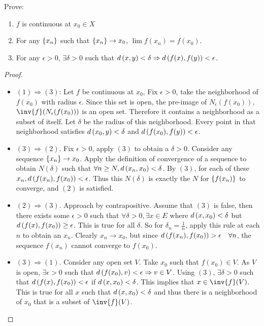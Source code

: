 \documentclass[12pt, letterpaper]{paper}
\begin{document}
\begin{question}
  Prove:
  \begin{enumerate}
  \item $f$ is continuous at $x_0 \in X$
  \item For any ${\left \{ x_n \right \}}$ such that ${\left \{ x_n \right \}} \to x_0$, $\lim f(x_n)
    = f(x_0)$.
  \item For any $\epsilon > 0$, $\exists \delta > 0$ such that $d \left ( x,y \right ) < \delta \Rightarrow
    d \left ( f(x), f(y) \right ) < \epsilon$.
  \end{enumerate}
  \begin{proof}
    \begin{itemize}
    \item $(1) \Rightarrow (3)$: Let $f$ be continuous at $x_0$, Fix
      $\epsilon > 0$, take the neighborhood of $f(x_0)$ with radius
      $\epsilon$. Since this set is open, the pre-image of $N_{\epsilon}(f(x_0))$,
      $\inv{f}( N_{\epsilon}(f({x_0})))$ is an open set. Therefore it
      contains a neighborhood as a subset of itself. Let $\delta$ be the
      radius of this neighborhood. Every point in that neighborhood
      satisfies $d \left ( x_0,y \right ) < \delta$ and $d \left ( f(x_0),f(y) \right ) < \epsilon$.
      
    \item $(3)\Rightarrow(2)$. Fix $\epsilon > 0$, apply $(3)$ to obtain a
      $\delta > 0$. Consider any sequence ${\left \{ x_n \right \}} \to x_0$. Apply the
      definition of convergence of a sequence to obtain $N(\delta)$ such that
      $\forall n \geq N, d \left ( x_n, x_0 \right ) < \delta$. By $(3)$, for each of these
      $x_n, d \left ( f(x_n), f(x_0) \right ) < \epsilon$. Thus this $N(\delta)$ is exactly the
      $N$ for ${\left \{ f(x_n) \right \}}$ to converge, and $(2)$ is satisfied.
      
    \item $(2)\Rightarrow(3)$. Approach by contrapositive.  Assume that
      $(3)$ is false, then there exists some $\epsilon > 0$ such that
      $\forall \delta > 0, \exists x \in E$ where
      $d \left ( x,x_0 \right ) < \delta$ but $d \left ( f(x), f(x_0) \right ) \geq \epsilon$. This is true for
      all $\delta$. So for $\delta_n = \frac{1}{n}$, apply this rule at each
      $n$ to obtain an $x_n$. Clearly $x_n \to x_0$, but since
      $d \left ( f(x_n),f(x_0) \right ) > \epsilon \quad \forall n$, the sequence
      $f(x_n)$ cannot converge to $f(x_0)$.
    \item $(3)\Rightarrow(1)$. Consider any open set $V$. Take $x_0$ such that
      $f(x_0) \in V$. As $V$ is open, $\exists \epsilon > 0$ such that $d \left ( f(x_0),
        v  \right ) < \epsilon \Rightarrow v \in V$. Using $(3)$, $\exists\delta > 0$ such that
      $d \left ( f(x), f(x_0) \right ) < \epsilon$ if $d \left ( x,x_0 \right ) < \delta$. This implies that
      $x \in \inv{f}(V)$. This is true for all $x$ such that
      $d \left ( x,x_0 \right ) < \delta$ and thus there is a neighborhood of $x_0$ that
      is a subset of $\inv{f}(V)$.
    \end{itemize}
  \end{proof}
\end{question}
\end{document}
